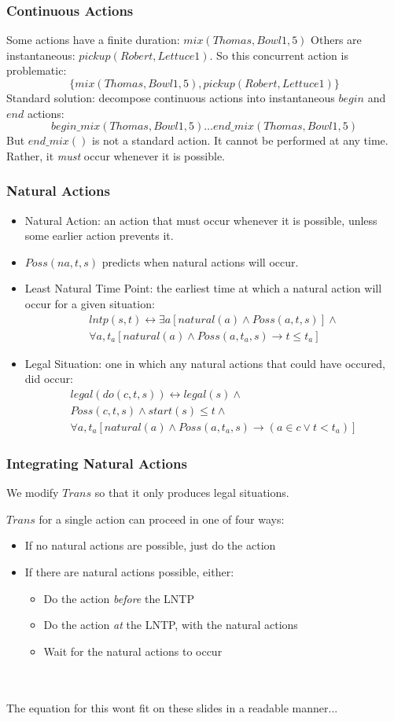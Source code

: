 \documentclass[compress]{beamer}
\begin{document}
\begin{frame}
\frametitle{Continuous Actions}
Some actions have a finite duration: $mix(Thomas,Bowl1,5)$
Others are instantaneous: $pickup(Robert,Lettuce1)$.
So this concurrent action is problematic:\[
\{mix(Thomas,Bowl1,5),pickup(Robert,Lettuce1)\}\]
Standard solution: decompose continuous actions into instantaneous $begin$
and $end$ actions:\[
begin\_mix(Thomas,Bowl1,5) \dots end\_mix(Thomas,Bowl1,5)\]
But $end\_mix()$ is not a standard action.  It cannot be performed at
any time.  Rather, it \emph{must} occur whenever it is possible.
\end{frame}

\begin{frame}
\frametitle{Natural Actions}
\begin{itemize}
  \item Natural Action:  an action that must occur whenever it is possible,
        unless some earlier action prevents it.
  \item $Poss(na,t,s)$ predicts when natural actions will occur.
  \item Least Natural Time Point: the earliest time at which a natural
        action will occur for a given situation:\[
\begin{array}{c}
lntp(s,t) \leftrightarrow \exists a [natural(a) \wedge Poss(a,t,s)] \wedge\\
\forall a,t_a [natural(a) \wedge Poss(a,t_a,s) \rightarrow t \leq t_a]
\end{array}\]
  \item Legal Situation: one in which any natural actions that could have occured, did occur:\[
\begin{array}{c}
legal(do(c,t,s)) \leftrightarrow legal(s) \wedge\\
Poss(c,t,s) \wedge start(s) \leq t \wedge\\
\forall a,t_a [natural(a) \wedge Poss(a,t_a,s) \rightarrow (a \in c \vee t < t_a)]
\end{array}\]
\end{itemize}
\end{frame}

\begin{frame}
\frametitle{Integrating Natural Actions}
We modify $Trans$ so that it only produces legal situations.

$Trans$ for a single action can proceed in one of four ways:
\begin{itemize}
\item If no natural actions are possible, just do the action
\item If there are natural actions possible, either:
\begin{itemize}
\item Do the action \emph{before} the LNTP
\item Do the action \emph{at} the LNTP, with the natural actions
\item Wait for the natural actions to occur
\end{itemize}
\end{itemize}
\ \\
\ \\
The equation for this wont fit on these slides in a readable manner...
\end{frame}
\end{document}
